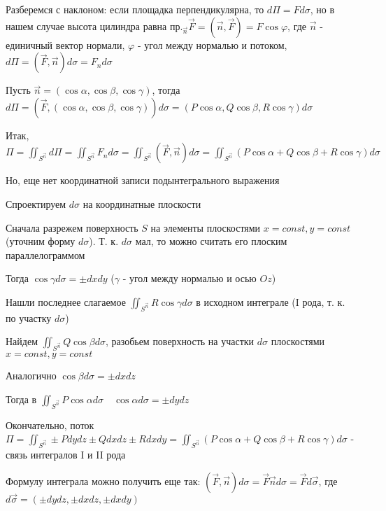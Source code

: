 \documentclass[12pt]{article}
\begin{document}
    Разберемся с наклоном: если площадка перпендикулярна, то $d\Pi = F d\sigma$,
    но в нашем случае высота цилиндра равна $\displaystyle \text{пр.}_\overrightarrow{n} \overrightarrow{F} = (\overrightarrow{n}, \overrightarrow{F}) = F \cos\varphi$, где $\overrightarrow{n}$ - единичный вектор нормали, $\varphi$ - угол между нормалью и потоком,
    $\displaystyle d\Pi = (\overrightarrow{F}, \overrightarrow{n}) d\sigma = F_n d\sigma$

    Пусть $\overrightarrow{n} = (\cos\alpha, \cos\beta, \cos\gamma)$, тогда $d\Pi = (\overrightarrow{F}, (\cos\alpha, \cos\beta, \cos\gamma)) d\sigma =
    (P\cos\alpha, Q\cos\beta, R\cos\gamma)d\sigma$

    Итак, $\displaystyle \Pi = \iint_{S^{\overrightarrow{n}}} d\Pi = \iint_{S^{\overrightarrow{n}}} F_n d\sigma = \iint_{S^{\overrightarrow{n}}} (\overrightarrow{F}, \overrightarrow{n})d\sigma = \iint_{S^{\overrightarrow{n}}} (P\cos\alpha + Q\cos\beta + R\cos\gamma)d\sigma$

    Но, еще нет координатной записи подынтегрального выражения

    Спроектируем $d\sigma$ на координатные плоскости

    Сначала разрежем поверхность $S$ на элементы плоскостями $x = const, y = const$ (уточним форму $d\sigma$). Т. к. $d\sigma$ мал, то можно считать его плоским параллелограммом

    Тогда $\cos\gamma d\sigma = \pm dxdy$ ($\gamma$ - угол между нормалью и осью $Oz$)

    Нашли последнее слагаемое $\displaystyle \iint_{S^{\overrightarrow{n}}} R\cos\gamma d\sigma$ в исходном интеграле (I рода, т. к. по участку $d\sigma$)

    Найдем $\displaystyle \iint_{S^{\overrightarrow{n}}} Q\cos\beta d\sigma$, разобьем поверхность на участки $d\sigma$ плоскостями $x = const, y = const$

    Аналогично $\cos\beta d\sigma = \pm dxdz$

    Тогда в $\displaystyle \iint_{S^{\overrightarrow{n}}} P\cos\alpha d\sigma \quad \cos\alpha d\sigma = \pm dydz$

    Окончательно, поток $\displaystyle \Pi = \iint_{S^{\overrightarrow{n}}} \pm Pdydz \pm Qdxdz \pm Rdxdy = \iint_{S^{\overrightarrow{n}}} (P\cos\alpha + Q\cos\beta + R\cos\gamma) d\sigma$ - связь интегралов I и II рода

    \Nota Формулу интеграла можно получить еще так: $(\overrightarrow{F}, \overrightarrow{n})d\sigma = \overrightarrow{F}\overrightarrow{n}d\sigma = \overrightarrow{F}d\overrightarrow{\sigma}$, где $d\overrightarrow{\sigma} = (\pm dydz, \pm dxdz, \pm dxdy)$
\end{document}
